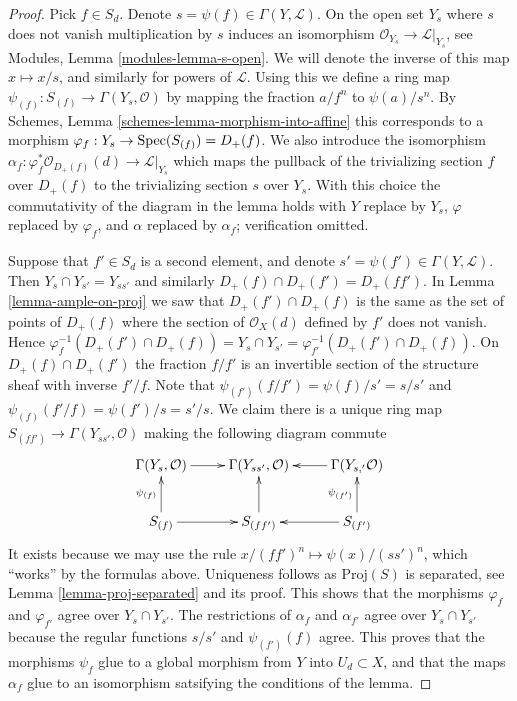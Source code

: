 \begin{proof}
Pick $f \in S_d$. Denote $s = \psi(f) \in \Gamma(Y, \mathcal{L})$.
On the open set $Y_s$ where $s$ does not vanish multiplication
by $s$ induces an isomorphism $\mathcal{O}_{Y_s} \to \mathcal{L}|_{Y_s}$,
see Modules, Lemma \ref{modules-lemma-s-open}. We will denote
the inverse of this map $x \mapsto x/s$, and similarly for
powers of $\mathcal{L}$. Using this we
define a ring map $\psi_{(f)} : S_{(f)} \to \Gamma(Y_s, \mathcal{O})$
by mapping the fraction $a/f^n$ to $\psi(a)/s^n$.
By Schemes, Lemma \ref{schemes-lemma-morphism-into-affine}
this corresponds to a morphism
$\varphi_f : Y_s \to \mathop{\rm Spec}(S_{(f)}) = D_{+}(f)$.
We also introduce the isomorphism
$\alpha_f : \varphi_f^*\mathcal{O}_{D_{+}(f)}(d) \to \mathcal{L}|_{Y_s}$
which maps the pullback of the trivializing section
$f$ over $D_{+}(f)$ to the trivializing section $s$ over $Y_s$.
With this choice the commutativity of the diagram in the lemma
holds with $Y$ replace by $Y_s$, $\varphi$ replaced by $\varphi_f$,
and $\alpha$ replaced by $\alpha_f$; verification omitted.

\medskip\noindent
Suppose that $f' \in S_d$ is a second element, and denote
$s' = \psi(f') \in \Gamma(Y, \mathcal{L})$. Then
$Y_s \cap Y_{s'} = Y_{ss'}$ and similarly
$D_{+}(f) \cap D_{+}(f') = D_{+}(ff')$.
In Lemma \ref{lemma-ample-on-proj} we saw that
$D_{+}(f') \cap D_{+}(f)$ is the same as the set
of points of $D_{+}(f)$ where the section of
$\mathcal{O}_X(d)$ defined by $f'$ does not vanish.
Hence
$\varphi_f^{-1}(D_{+}(f') \cap D_{+}(f)) = Y_s \cap Y_{s'}
= \varphi_{f'}^{-1}(D_{+}(f') \cap D_{+}(f))$.
On $D_{+}(f) \cap D_{+}(f')$ the fraction $f/f'$ is an
invertible section of the structure sheaf with inverse
$f'/f$. Note that $\psi_{(f')}(f/f') = \psi(f)/s' = s/s'$
and $\psi_{(f)}(f'/f) = \psi(f')/s = s'/s$. We claim there
is a unique ring map
$S_{(ff')} \to \Gamma(Y_{ss'}, \mathcal{O})$ making the
following diagram commute
$$
\xymatrix{
\Gamma(Y_s, \mathcal{O}) \ar[r] &
\Gamma(Y_{ss'}, \mathcal{O}) &
\Gamma(Y_{s, '} \mathcal{O}) \ar[l]\\
S_{(f)} \ar[r] \ar[u]^{\psi_{(f)}} &
S_{(ff')} \ar[u] &
S_{(f')} \ar[l] \ar[u]^{\psi_{(f')}}
}
$$
It exists because we may use the rule
$x/(ff')^n \mapsto \psi(x)/(ss')^n$, which ``works'' by the formulas
above. Uniqueness follows as $\text{Proj}(S)$ is separated, see
Lemma \ref{lemma-proj-separated} and its proof. This shows that the
morphisms $\varphi_f$ and $\varphi_{f'}$ agree over $Y_s \cap Y_{s'}$.
The restrictions of $\alpha_f$ and $\alpha_{f'}$ agree over
$Y_s \cap Y_{s'}$ because the regular functions $s/s'$ and
$\psi_{(f')}(f)$ agree. This proves that the morphisms $\psi_f$
glue to a global morphism from $Y$ into $U_d \subset X$, and
that the maps $\alpha_f$ glue to an isomorphism satsifying the
conditions of the lemma.


\end{proof}
